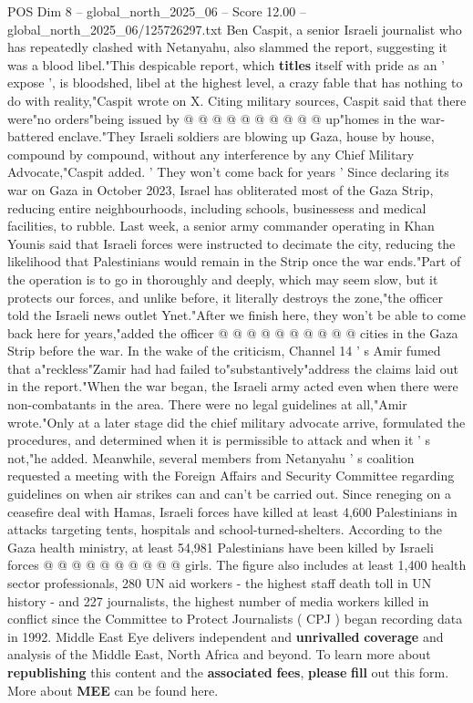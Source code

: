 \begin{textsample}{POS Dim 8 – global\_north\_2025\_06 – Score 12.00 – global\_north\_2025\_06/125726297.txt}
Ben Caspit, a senior Israeli journalist who has repeatedly clashed with Netanyahu, also slammed the report, suggesting it was a blood libel."This despicable report, which \textbf{titles} itself with pride as an ' expose ', is bloodshed, libel at the highest level, a crazy fable that has nothing to do with reality,"Caspit wrote on X.
Citing military sources, Caspit said that there were"no orders"being issued by @ @ @ @ @ @ @ @ @ @ up"homes in the war-battered enclave."They Israeli soldiers are blowing up Gaza, house by house, compound by compound, without any interference by any Chief Military Advocate,"Caspit added. ' They won't come back for years ' Since declaring its war on Gaza in October 2023, Israel has obliterated most of the Gaza Strip, reducing entire neighbourhoods, including schools, businessess and medical facilities, to rubble.
Last week, a senior army commander operating in Khan Younis said that Israeli forces were instructed to decimate the city, reducing the likelihood that Palestinians would remain in the Strip once the war ends."Part of the operation is to go in thoroughly and deeply, which may seem slow, but it protects our forces, and unlike before, it literally destroys the zone,"the officer told the Israeli news outlet Ynet."After we finish here, they won't be able to come back here for years,"added the officer @ @ @ @ @ @ @ @ @ @ cities in the Gaza Strip before the war.
In the wake of the criticism, Channel 14 ' s Amir fumed that a"reckless"Zamir had had failed to"substantively"address the claims laid out in the report."When the war began, the Israeli army acted even when there were non-combatants in the area.
There were no legal guidelines at all,"Amir wrote."Only at a later stage did the chief military advocate arrive, formulated the procedures, and determined when it is permissible to attack and when it ' s not,"he added.
Meanwhile, several members from Netanyahu ' s coalition requested a meeting with the Foreign Affairs and Security Committee regarding guidelines on when air strikes can and can't be carried out.
Since reneging on a ceasefire deal with Hamas, Israeli forces have killed at least 4,600 Palestinians in attacks targeting tents, hospitals and school-turned-shelters.
According to the Gaza health ministry, at least 54,981 Palestinians have been killed by Israeli forces @ @ @ @ @ @ @ @ @ @ girls.
The figure also includes at least 1,400 health sector professionals, 280 UN aid workers - the highest staff death toll in UN history - and 227 journalists, the highest number of media workers killed in conflict since the Committee to Protect Journalists ( CPJ ) began recording data in 1992.
Middle East Eye delivers independent and \textbf{unrivalled} \textbf{coverage} and analysis of the Middle East, North Africa and beyond.
To learn more about \textbf{republishing} this content and the \textbf{associated} \textbf{fees}, \textbf{please} \textbf{fill} out this form.
More about \textbf{MEE} can be found here.

\end{textsample}
